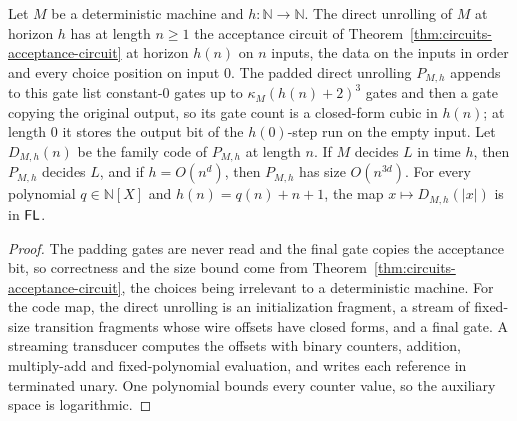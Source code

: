 \begin{lemma}
  \label{lem:circuits-padded-code-fl}
  \leanok
  Let $M$ be a deterministic machine and $h : \mathbb{N} \to \mathbb{N}$. The
  direct unrolling of $M$ at horizon $h$ has at length $n \ge 1$ the acceptance
  circuit of Theorem~\ref{thm:circuits-acceptance-circuit} at horizon $h(n)$ on
  $n$ inputs, the data on the inputs in order and every choice position on
  input $0$. The padded direct unrolling $P_{M,h}$ appends to this gate list
  constant-$0$ gates up to $\kappa_M (h(n) + 2)^3$ gates and then a gate
  copying the original output, so its gate count is a closed-form cubic in
  $h(n)$; at length $0$ it stores the output bit of the $h(0)$-step run on the
  empty input. Let $D_{M,h}(n)$ be the family code of $P_{M,h}$ at length $n$.
  If $M$ decides $L$ in time $h$, then $P_{M,h}$ decides $L$, and if
  $h = O(n^d)$, then $P_{M,h}$ has size $O(n^{3d})$. For every polynomial
  $q \in \mathbb{N}[X]$ and $h(n) = q(n) + n + 1$, the map
  $x \mapsto D_{M,h}(|x|)$ is in $\mathsf{FL}$.
\end{lemma}
\begin{proof}
  \leanok
  The padding gates are never read and the final gate copies the acceptance
  bit, so correctness and the size bound come from
  Theorem~\ref{thm:circuits-acceptance-circuit}, the choices being irrelevant
  to a deterministic machine. For the code map, the direct unrolling is an
  initialization fragment, a stream of fixed-size
  transition fragments whose wire offsets have closed forms, and a final gate.
  A streaming transducer computes the offsets with binary counters, addition,
  multiply-add and fixed-polynomial evaluation, and writes each reference in
  terminated unary. One polynomial bounds every counter value, so the
  auxiliary space is logarithmic.
\end{proof}

